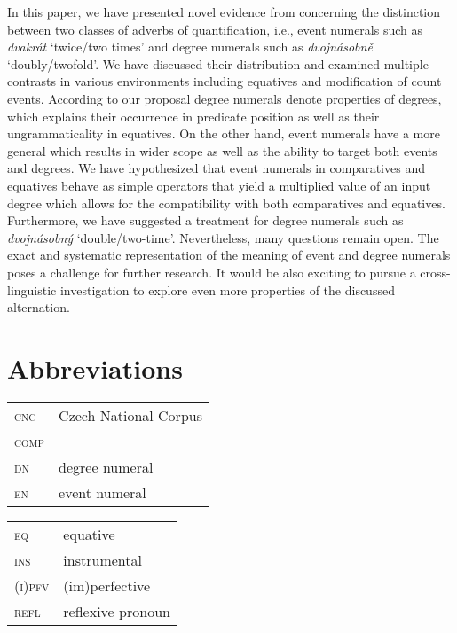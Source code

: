 \documentclass[output=paper,modfonts,hidelinks,newtxmath
\ChapterDOI{10.5281/zenodo.2545513}
]{langscibook}
\begin{document}
In this paper, we have presented novel evidence from  concerning the distinction between two classes of adverbs of quantification, i.e., event numerals such as \textit{dvakrát} `twice/two times' and degree numerals such as \textit{dvojnásobně} `doubly/twofold'. We have discussed their distribution and examined multiple contrasts in various environments including equatives and modification of count events. According to our proposal degree numerals denote properties of degrees, which explains their occurrence in predicate position as well as their ungrammaticality in equatives. On the other hand, event numerals have a more general  which results in wider scope as well as the ability to target both events and degrees. We have hypothesized that event numerals in comparatives and equatives behave as simple operators that yield a multiplied value of an input degree which allows for the compatibility with both comparatives and equatives. Furthermore, we have suggested a treatment for  degree numerals such as \textit{dvojnásobný} `double/two-time'. Nevertheless, many questions remain open. The exact and systematic representation of the meaning of event and degree numerals poses a challenge for further research. It would be also exciting to pursue a cross-linguistic investigation to explore even more properties of the discussed alternation.

\section*{Abbreviations}

\begin{tabularx}{.5\textwidth}{@{}lQ@{}}
\textsc{cnc}&{Czech} National Corpus\\
\textsc{comp}&\\
\textsc{dn}&degree {numeral}\\
\textsc{en}&event {numeral}\\
\end{tabularx}%
\begin{tabularx}{.5\textwidth}{@{}lQ@{}}
\textsc{eq}&{equative}\\
\textsc{ins}&{instrumental}\\
\textsc{(i)pfv}&(im){perfective}\\
\textsc{refl}&reflexive {pronoun}\\
\end{tabularx}
\end{document}
